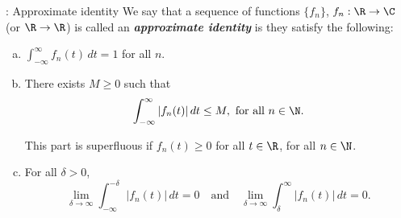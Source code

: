 \begin{ndef}{: Approximate identity}
	We say that a sequence of functions \(\{f_n\}\), \(f_n:\R\to\C\) (or \(\R\to\R\)) is called an \emph{\textbf{approximate identity}} is they satisfy the following:
	\begin{enumerate}[(a)]
		\item \(\displaystyle\int_{-\infty}^{\infty}f_n(t) \, dt=1\) for all \(n\).
		
		\item There exists \(M\geq 0\) such that 
			  \begin{equation*}
			  	\int_{-\infty}^{\infty} |f_n(t)| \, dt\leq M,~\text{for all}~n\in\N.
			  \end{equation*}
			  \begin{note}
			  	This part is superfluous if \(f_n(t)\geq 0\) for all \(t\in\R\), for all \(n\in\N\).
			  \end{note}
			  
  	    \item For all \(\delta>0\), 
  	    \begin{equation*}
  	    	\lim_{\delta\to \infty}\int_{-\infty}^{-\delta} |f_n(t)| \, dt=0\quad \text{and}\quad\lim_{\delta\to \infty}\int_{\delta}^{\infty} |f_n(t)| \, dt=0.
  	    \end{equation*}
	\end{enumerate}
\end{ndef}
